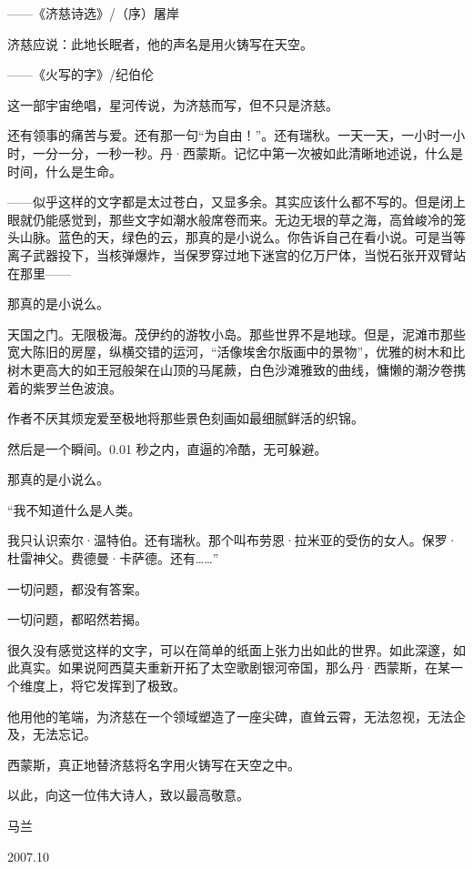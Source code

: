\documentclass[AutoFakeBold=true]{book}
\begin{document}
——《济慈诗选》/（序）屠岸

\vspace*{1em}

济慈应说：此地长眠者，他的声名是用火铸写在天空。

——《火写的字》/纪伯伦

\vspace*{1em}

这一部宇宙绝唱，星河传说，为济慈而写，但不只是济慈。

还有领事的痛苦与爱。还有那一句``为自由！''。还有瑞秋。一天一天，一小时一小时，一分一分，一秒一秒。丹·西蒙斯。记忆中第一次被如此清晰地述说，什么是时间，什么是生命。

——似乎这样的文字都是太过苍白，又显多余。其实应该什么都不写的。但是闭上眼就仍能感觉到，那些文字如潮水般席卷而来。无边无垠的草之海，高耸峻冷的笼头山脉。蓝色的天，绿色的云，那真的是小说么。你告诉自己在看小说。可是当等离子武器投下，当核弹爆炸，当保罗穿过地下迷宫的亿万尸体，当悦石张开双臂站在那里——

那真的是小说么。

天国之门。无限极海。茂伊约的游牧小岛。那些世界不是地球。但是，泥滩市那些宽大陈旧的房屋，纵横交错的运河，``活像埃舍尔版画中的景物''，优雅的树木和比树木更高大的如王冠般架在山顶的马尾蕨，白色沙滩雅致的曲线，慵懒的潮汐卷携着的紫罗兰色波浪。

作者不厌其烦宠爱至极地将那些景色刻画如最细腻鲜活的织锦。

然后是一个瞬间。0.01 秒之内，直逼的冷酷，无可躲避。

那真的是小说么。

\vspace*{1em}

``我不知道什么是人类。

我只认识索尔·温特伯。还有瑞秋。那个叫布劳恩·拉米亚的受伤的女人。保罗·杜雷神父。费德曼·卡萨德。还有……''

\vspace*{1em}

一切问题，都没有答案。

一切问题，都昭然若揭。

\vspace*{1em}

很久没有感觉这样的文字，可以在简单的纸面上张力出如此的世界。如此深邃，如此真实。如果说阿西莫夫重新开拓了太空歌剧银河帝国，那么丹·西蒙斯，在某一个维度上，将它发挥到了极致。

他用他的笔端，为济慈在一个领域塑造了一座尖碑，直耸云霄，无法忽视，无法企及，无法忘记。

\vspace*{1em}

西蒙斯，真正地替济慈将名字用火铸写在天空之中。

以此，向这一位伟大诗人，致以最高敬意。

\begin{flushright}
	马兰

	2007.10
\end{flushright}
\end{document}
